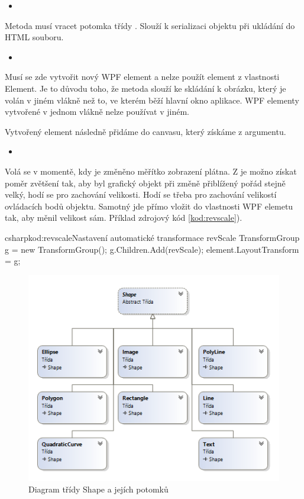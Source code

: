 \documentclass[
  field=inf,
  biblatex,
  glossaries,
  index
]{kidiplom}
\begin{document}
\begin{itemize}
\item {}
\end{itemize}
Metoda musí vracet potomka třídy . Slouží k serializaci objektu při ukládání do HTML souboru.

\begin{itemize}
\item {}
\end{itemize}
Musí se zde vytvořit nový WPF element a nelze použít element z vlastnosti Element. Je to důvodu toho, že metoda slouží ke skládání k obrázku, který je volán v jiném vlákně než to, ve kterém běží hlavní okno aplikace. WPF elementy vytvořené v jednom vlákně nelze používat v jiném.

Vytvořený element následně přidáme do canvasu, který získáme z argumentu.

\begin{itemize}
\item {}
\end{itemize}

Volá se v momentě, kdy je změněno měřítko zobrazení plátna. Z  je možno získat poměr zvětšení tak, aby byl grafický objekt při změně přiblížený pořád stejně velký, hodí se pro zachování velikosti. Hodí se třeba pro zachování velikostí ovládacích bodů objektu. Samotný  jde přímo vložit do vlastnosti WPF elemetu tak, aby měnil velikost sám. Příklad zdrojový kód \ref{kod:revscale}).

\begin{kicode}{csharp}{kod:revscale}{Nastavení automatické transformace revScale}
TransformGroup g = new TransformGroup();
g.Children.Add(revScale);
element.LayoutTransform = g;
\end{kicode}


\begin{figure}
\includegraphics[width=15cm]{img/shape_diag}
\caption{Diagram třídy Shape a jejích potomků}
\end{figure}  
\end{document}
